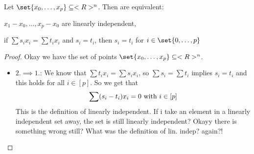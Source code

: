 \begin{proposition}
	Let $\set{x_0, \dots, x_p} \subseteq \Rn$. Then are equivalent:
	\begin{propenum}
		\item $x_1 - x_0, \dots, x_p - x_0$ are linearly independent,
		\item if $\sum s_i x_i = \sum t_i x_i$ and $s_i = t_i$, then $s_i = t_i$ for $i \in \set{0,\dots,p}$
	\end{propenum}
\end{proposition}
\begin{proof}
	Okay we have the set of points $\set{x_0, \dots, x_p}\subseteq \Rn$.
	\begin{itemize}
		\item $2. \implies 1.$: We know that $\sum t_i x_i = \sum s_i x_i$, so $\sum s_i = \sum t_i$ implies $s_i = t_i$ and this holds for all $i \in [p]$. So we get that 
		\begin{align*}
			\sum (s_i - t_i) x_i = 0 \text{ with } i \in [p]
		\end{align*}
		This is the definition of linearly independent. If i take an element in a linearly independent set away, the set is still linearly independent? Okayy there is something wrong still? What was the definition of lin. indep? again?!
	\end{itemize}
\end{proof}